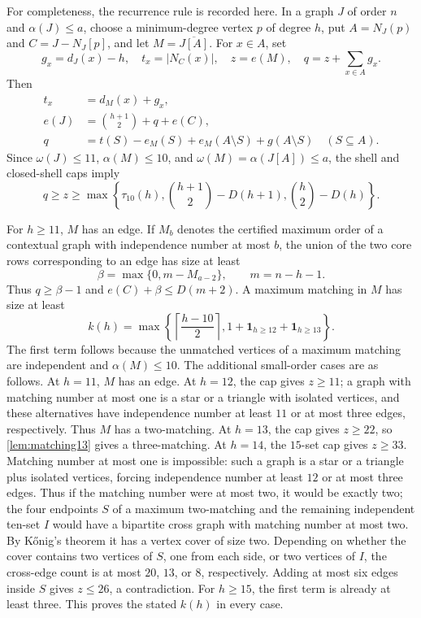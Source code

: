 For completeness, the recurrence rule is recorded here. In a graph $J$ of order $n$ and $\alpha(J)\leq a$, choose a minimum-degree vertex $p$ of degree $h$, put $A=N_J(p)$ and $C=J-N_J[p]$, and let $M=\overline{J[A]}$. For $x\in A$, set
\[
g_x=d_J(x)-h,\quad t_x=|N_C(x)|,\quad z=e(M),\quad
q=z+\sum_{x\in A}g_x.
\]
Then
\begin{align}
t_x&=d_M(x)+g_x,\\
e(J)&=\binom{h+1}{2}+q+e(C),\\
q&=t(S)-e_M(S)+e_M(A\setminus S)+g(A\setminus S)
\quad(S\subseteq A).
\label{eq:recurrence-pivot}
\end{align}
Since $\omega(J)\leq11$, $\alpha(M)\leq10$, and $\omega(M)=\alpha(J[A])\leq a$, the shell and closed-shell caps imply
\[
q\geq z\geq
\max\left\{\tau_{10}(h),\binom{h+1}{2}-D(h+1),
\binom h2-D(h)\right\}.
\]

For $h\geq11$, $M$ has an edge. If $M_b$ denotes the certified maximum order of a contextual graph with independence number at most $b$, the union of the two core rows corresponding to an edge has size at least
\[
\beta=\max\{0,m-M_{a-2}\},\qquad m=n-h-1.
\]
Thus $q\geq\beta-1$ and $e(C)+\beta\leq D(m+2)$. A maximum matching in $M$ has size at least
\[
k(h)=\max\left\{\left\lceil\frac{h-10}{2}\right\rceil,
1+\mathbf 1_{h\geq12}+\mathbf 1_{h\geq13}\right\}.
\]
The first term follows because the unmatched vertices of a maximum matching are independent and $\alpha(M)\leq10$. The additional small-order cases are as follows. At $h=11$, $M$ has an edge. At $h=12$, the cap gives $z\geq11$; a graph with matching number at most one is a star or a triangle with isolated vertices, and these alternatives have independence number at least $11$ or at most three edges, respectively. Thus $M$ has a two-matching. At $h=13$, the cap gives $z\geq22$, so \cref{lem:matching13} gives a three-matching. At $h=14$, the $15$-set cap gives $z\geq33$. Matching number at most one is impossible: such a graph is a star or a triangle plus isolated vertices, forcing independence number at least $12$ or at most three edges. Thus if the matching number were at most two, it would be exactly two; the four endpoints $S$ of a maximum two-matching and the remaining independent ten-set $I$ would have a bipartite cross graph with matching number at most two. By K\H{o}nig's theorem it has a vertex cover of size two. Depending on whether the cover contains two vertices of $S$, one from each side, or two vertices of $I$, the cross-edge count is at most $20$, $13$, or $8$, respectively. Adding at most six edges inside $S$ gives $z\leq26$, a contradiction. For $h\geq15$, the first term is already at least three. This proves the stated $k(h)$ in every case.

